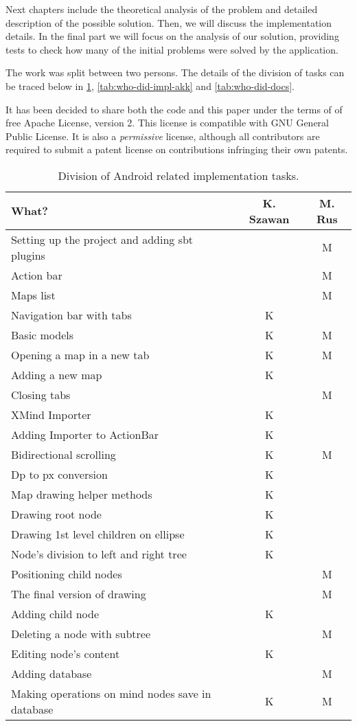 
Next chapters include the theoretical analysis of the problem and detailed description of the possible solution. Then, we will discuss the implementation details. In the final part we will focus on the analysis of our solution, providing tests to check how many of the initial problems were solved by the application.

The work was split between two persons. The details of the division of tasks can be traced below in \cref{tab:who-did-impl}, \cref{tab:who-did-impl-akk} and \cref{tab:who-did-docs}.

It has been decided to share both the code and this paper under the terms of of free Apache License, version 2. This license is compatible with GNU General Public License. It is also a \emph{permissive} license, although all contributors are required to submit a patent license on contributions infringing their own patents.

\begin{table}[h]
	\centering
	\begin{tabular}{l|c|c}
		What? & K. Szawan & M. Rus \\
		\hline
		Setting up the project and adding sbt plugins &  & M \\
		Action bar & & M\\
		Maps list & & M\\
		Navigation bar with tabs & K & \\
		Basic models & K & M\\
		Opening a map in a new tab & K & M\\
		Adding a new map & K & \\
		Closing tabs & & M\\
		XMind Importer & K & \\
		Adding Importer to ActionBar & K & \\
	    Bidirectional scrolling & K & M \\
	    Dp to px conversion & K & \\
	    Map drawing helper methods  & K & \\
	    Drawing root node & K & \\
	    Drawing 1st level children on ellipse & K & \\
	    Node's division to left and right tree & K & \\
	    Positioning child nodes & & M \\
	    The final version of drawing & & M \\
	    Adding child node & K & \\
	    Deleting a node with subtree &  & M \\
	    Editing node's content &  K & \\
	    Adding database &  & M \\
	    Making operations on mind nodes save in database & K & M \\
	\end{tabular}
	\caption{Division of Android related implementation tasks.}
	\label{tab:who-did-impl}
\end{table}



